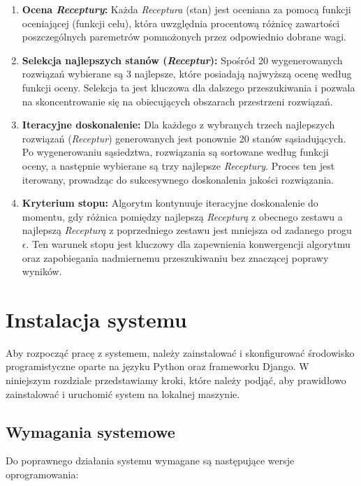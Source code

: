 \documentclass[shortabstract]{iithesis}
\begin{document}
\begin{enumerate}
\item \textbf{Ocena \textit{Receptury}:} Każda \textit{Receptura} (stan) jest oceniana za pomocą funkcji oceniającej (funkcji celu), która uwzględnia procentową różnicę zawartości poszczególnych paremetrów pomnożonych przez odpowiednio dobrane wagi.

\item \textbf{Selekcja najlepszych stanów (\textit{Receptur}):} Spośród 20 wygenerowanych rozwiązań wybierane są 3 najlepsze, które posiadają najwyższą ocenę według funkcji oceny. Selekcja ta jest kluczowa dla dalszego przeszukiwania i pozwala na skoncentrowanie się na obiecujących obszarach przestrzeni rozwiązań.

\item \textbf{Iteracyjne doskonalenie:} Dla każdego z wybranych trzech najlepszych rozwiązań (\textit{Receptur}) generowanych jest ponownie 20 stanów sąsiadujących. Po wygenerowaniu sąsiedztwa, rozwiązania są sortowane według funkcji oceny, a następnie wybierane są trzy najlepsze \textit{Receptury}. Proces ten jest iterowany, prowadząc do sukcesywnego doskonalenia jakości rozwiązania.

\item \textbf{Kryterium stopu:} Algorytm kontynuuje iteracyjne doskonalenie do momentu, gdy różnica pomiędzy najlepszą \textit{Recepturą} z obecnego zestawu a najlepszą \textit{Recepturą} z poprzedniego zestawu jest mniejsza od zadanego progu $\epsilon$. Ten warunek stopu jest kluczowy dla zapewnienia konwergencji algorytmu oraz zapobiegania nadmiernemu przeszukiwaniu bez znaczącej poprawy wyników.

\end{enumerate}


\chapter{Instalacja systemu}

Aby rozpocząć pracę z systemem, należy zainstalować i skonfigurować środowisko programistyczne oparte na języku Python oraz frameworku Django. W niniejszym rozdziale przedstawiamy kroki, które należy podjąć, aby prawidłowo zainstalować i uruchomić system na lokalnej maszynie.

\section{Wymagania systemowe}

Do poprawnego działania systemu wymagane są następujące wersje oprogramowania:
\end{document}
